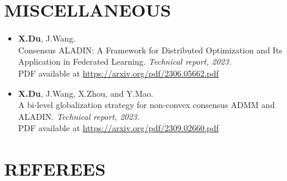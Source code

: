 \documentclass[paper=a4,fontsize=11pt]{scrartcl} %
\newcommand{\NewPart}[1]{\section*{\uppercase{#1}}}
\begin{document}
\NewPart{Miscellaneous}

\begin{itemize}
	\item {\textbf{X.Du}, J.Wang. \\
				{Consensus ALADIN: A Framework for Distributed Optimization and Its Application
						in Federated Learning.}
				\emph{Technical report, 2023.
				} \\
				PDF available at \url{https://arxiv.org/pdf/2306.05662.pdf}
			}
			\item {\textbf{X.Du}, J.Wang, X.Zhou, and Y.Mao. \\
				{A bi-level globalization strategy for non-convex consensus ADMM and ALADIN.}
				\emph{Technical report, 2023.
				} \\
				PDF available at \url{https://arxiv.org/pdf/2309.02660.pdf}
			}
\end{itemize}
\NewPart{Referees}
\end{document}
